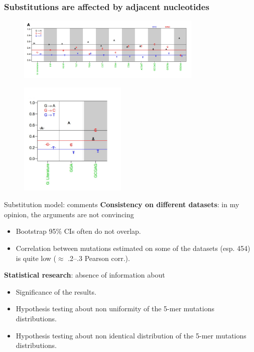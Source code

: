 \documentclass{beamer}\usepackage[]{graphicx}\usepackage[]{color}
\begin{document}
\begin{frame}
  \frametitle{Substitutions are affected by adjacent nucleotides}
  \begin{figure}[h]
    \center\includegraphics[width=250pt]{Pictures/substitution_adj_nucl.jpg}
 \end{figure}
  \begin{figure}[h]
    \center\includegraphics[width=145pt]{Pictures/substitution_adj_nucl.png}
 \end{figure}
\end{frame}

\begin{frame}{Substitution model: comments}
    \textbf{Consistency on different datasets}: in my opinion, the arguments are not convincing
    \begin{itemize}
        \item Bootstrap 95\% CIs often do not overlap.
        \item Correlation between mutations estimated on some of the datasets (esp. 454) is quite low ($\approx$ .2--.3 Pearson corr.).
    \end{itemize}
    \textbf{Statistical research}: absence of information about
    \begin{itemize}
        \item Significance of the results.
        \item Hypothesis testing about non uniformity of the 5-mer mutations distributions.
        \item Hypothesis testing about non identical distribution of the 5-mer mutations distributions.
    \end{itemize}
\end{frame}
\end{document}
